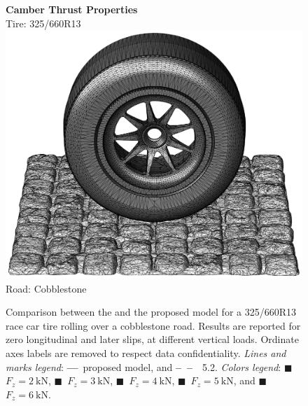 \begin{figure}
  \centering
  \begin{minipage}[c]{0.70\linewidth}
    \raggedleft
  \end{minipage}%
  \hfill
  \begin{minipage}[c]{0.29\linewidth}
    \centering
    \textbf{Camber Thrust Properties} \\[0.4em]
    Tire: 325/660R13 \\[0.4em]
    \includegraphics[width=1.0\linewidth, trim={15.75cm 3.5cm 14.0cm 6.5cm}, clip]{./figures/chapter_4/render_cobblestone}
    Road: Cobblestone
  \end{minipage}
  \caption{Comparison between the \MagicFormulae{} and the proposed model for a 325/660R13 race car tire rolling over a cobblestone road. Results are reported for zero longitudinal and later slips, at different vertical loads. Ordinate axes labels are removed to respect data confidentiality. \emph{Lines and marks legend}: \textbf{---}~proposed model, and \textbf{--~--}~\MagicFormulae{}~5.2. \emph{Colors legend}: \textcolor{mycolor1}{$\blacksquare$}~$F_z = \SI{2}{\kilo\newton}$, \textcolor{mycolor2}{$\blacksquare$}~$F_z =\SI{3}{\kilo\newton}$, \textcolor{mycolor3}{$\blacksquare$}~$F_z = \SI{4}{\kilo\newton}$, \textcolor{mycolor4}{$\blacksquare$}~$F_z =\SI{5}{\kilo\newton}$, and \textcolor{mycolor5}{$\blacksquare$}~$F_z = \SI{6}{\kilo\newton}$.}
  \label{chap4:fig:racecar_cobblestone}
\end{figure}

